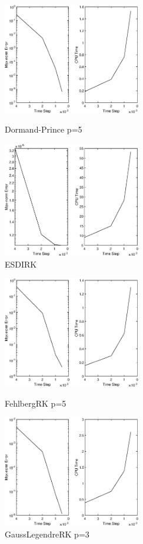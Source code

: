 \documentclass[12]{article}%
\begin{document}
\begin{figure}[H]
    \centering
    \begin{minipage}[t]{0.48\textwidth}
    \centering
    \includegraphics[width=6cm]{../pic/DormandPrinceRK5test1.eps}
    \caption{Dormand-Prince p=5}
    \end{minipage}
    \begin{minipage}[t]{0.48\textwidth}
    \centering
    \includegraphics[width=6cm]{../pic/ESDIRK5test1.eps}
    \caption{ESDIRK}
    \end{minipage}
\end{figure}
\begin{figure}[H]
    \centering
    \begin{minipage}[t]{0.48\textwidth}
    \centering
    \includegraphics[width=6cm]{../pic/FehlbergRK5test1.eps}
    \caption{FehlbergRK p=5}
    \end{minipage}
    \begin{minipage}[t]{0.48\textwidth}
    \centering
    \includegraphics[width=6cm]{../pic/GaussLegendreRK3test1.eps}
    \caption{GaussLegendreRK p=3}
    \end{minipage}
\end{figure}
\end{document}

